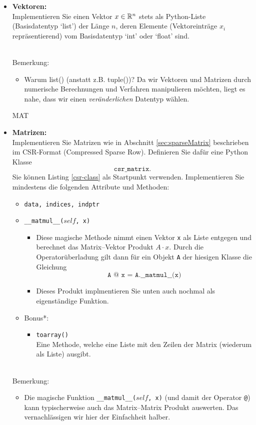 	\begin{itemize}
		\item \textbf{Vektoren:}\\ Implementieren Sie einen Vektor $x \in {\mathbb{R}}^{n}$ stets als Python-Liste (Basisdatentyp `list') der Länge $n$, deren Elemente (Vektoreinträge $x_i$ repräsentierend) vom Basisdatentyp `int' oder `float' sind.\\
				{	 
			~\\
			Bemerkung: \vspace{-0.2cm}
			\begin{itemize}
				\item Warum list() (anstatt z.B. tuple())? Da wir Vektoren und Matrizen durch numerische Berechnungen und Verfahren manipulieren möchten, liegt es nahe, dass wir einen \textit{veränderlichen} Datentyp wählen.
		\end{itemize}}
	
	 MAT
	
		\item \textbf{Matrizen:}\\ Implementieren Sie Matrizen wie in Abschnitt \ref{sec:sparseMatrix} beschrieben im CSR-Format (Compressed Sparse Row). Definieren Sie dafür eine Python Klasse $$\texttt{csr\_matrix}.$$ Sie können Listing \ref{csr-class} als Startpunkt verwenden. Implementieren Sie mindestens die folgenden Attribute und Methoden:
		\begin{itemize}
			\item \texttt{data, indices, indptr}
			\item \texttt{\_\_matmul\_\_($self$, x)}
			\begin{itemize}
				\item Diese magische Methode nimmt einen Vektor \texttt{x} als Liste entgegen und berechnet das Matrix--Vektor Produkt $A\cdot x$. Durch die Operatorüberladung gilt dann für ein Objekt \texttt{A} der hiesigen Klasse die Gleichung
						$$\texttt{A @ x = A.\_\_matmul\_\_(x)} $$
				\item Dieses Produkt implmentieren Sie unten auch nochmal als eigenständige Funktion.
			\end{itemize}
			\item Bonus*:
			\begin{itemize}
				\item \texttt{toarray()}\\
				Eine Methode, welche eine Liste mit den Zeilen der Matrix (wiederum als Liste) ausgibt.
			\end{itemize}
		\end{itemize}
			{	 
		~\\
		Bemerkung: 
		\begin{itemize}
			\item Die magische Funktion \texttt{\_\_matmul\_\_($self$, x)} (und damit der Operator \texttt{@}) kann typischerweise auch das Matrix--Matrix Produkt auswerten. Das vernachlässigen wir hier der Einfachheit halber.
	\end{itemize}}
	
	\end{itemize}





